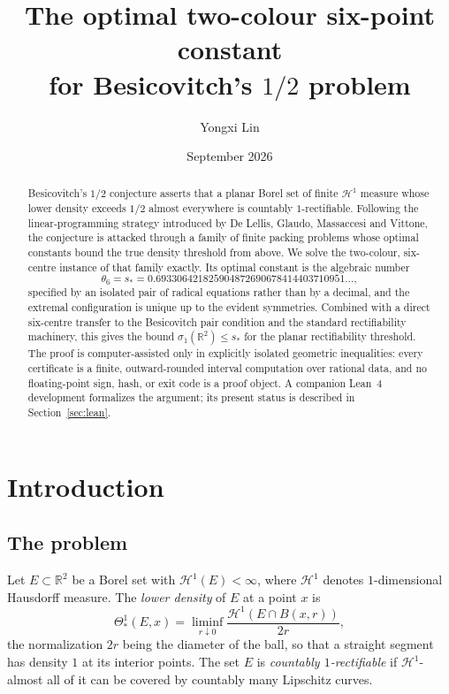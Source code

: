 \documentclass[11pt]{article}
\title{\bfseries The optimal two-colour six-point constant\\[0.3em]
\large for Besicovitch's $1/2$ problem}
\author{Yongxi Lin}
\date{September 2026}
\theoremstyle{plain}
\theoremstyle{definition}
\theoremstyle{remark}
\newcommand{\R}{\mathbb R}
\newcommand{\HH}{\mathcal H}
\newcommand{\sstar}{s_{\!*}}
\newcommand{\lowdens}{\Theta^{1}_{*}}
\begin{document}
\maketitle

\begin{abstract}
Besicovitch's $1/2$ conjecture asserts that a planar Borel set of finite
$\HH^1$ measure whose lower density exceeds $1/2$ almost everywhere is
countably $1$-rectifiable.  Following the linear-programming strategy
introduced by De Lellis, Glaudo, Massaccesi and Vittone, the conjecture is
attacked through a family of finite packing problems whose optimal
constants bound the true density threshold from above.  We solve the
two-colour, six-centre instance of that family exactly.  Its optimal
constant is the algebraic number
\[
 \theta_6=\sstar=0.693306421825904872690678414403710951\ldots,
\]
specified by an isolated pair of radical equations rather than by a
decimal, and the extremal configuration is unique up to the evident
symmetries.  Combined with a direct six-centre transfer to the Besicovitch
pair condition and the standard rectifiability machinery, this gives the
bound $\sigma_1(\R^2)\le\sstar$ for the planar rectifiability threshold.
The proof is computer-assisted only in explicitly isolated geometric
inequalities: every certificate is a finite, outward-rounded interval
computation over rational data, and no floating-point sign, hash, or exit
code is a proof object.  A companion Lean~4 development formalizes the
argument; its present status is described in Section~\ref{sec:lean}.
\end{abstract}

\tableofcontents

\section{Introduction}\label{sec:intro}

\subsection{The problem}

Let $E\subset\R^2$ be a Borel set with $\HH^1(E)<\infty$, where $\HH^1$
denotes $1$-dimensional Hausdorff measure.  The \emph{lower density} of $E$
at a point $x$ is
\[
 \lowdens(E,x)=\liminf_{r\downarrow0}\frac{\HH^1(E\cap B(x,r))}{2r},
\]
the normalization $2r$ being the diameter of the ball, so that a straight
segment has density $1$ at its interior points.  The set $E$ is
\emph{countably $1$-rectifiable} if $\HH^1$-almost all of it can be covered
by countably many Lipschitz curves.
\end{document}
